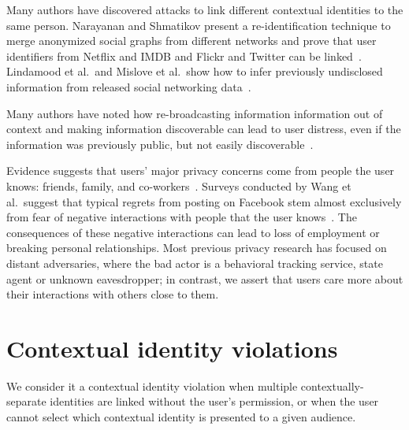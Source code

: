 \documentclass[10pt, conference, compsocconf]{IEEEtran}
\begin{document}
Many authors have discovered attacks to link different contextual identities to
the same person. Narayanan and Shmatikov present a re-identification technique
to merge anonymized social graphs from different networks and prove that
user identifiers from Netflix and IMDB and Flickr and Twitter can be
linked~\cite{narayanan1,narayanan2}. Lindamood et al.~and Mislove et al.~show
how to infer previously undisclosed information from released social networking
data~\cite{lindamood,mislove}.

Many authors have noted how re-broadcasting information information out of
context and making information discoverable can lead to user distress, even if
the information was previously public, but not easily
discoverable~\cite{boyd1,chew,nissenbaum}.

Evidence suggests that users' major privacy concerns come from people the user
knows: friends, family, and co-workers~\cite{fbtips2,fbtips1}.  Surveys
conducted by Wang et al.~suggest that typical regrets from posting on Facebook
stem almost exclusively from fear of negative interactions with people that the
user knows~\cite{wang}. The consequences of these negative interactions can
lead to loss of employment or breaking personal relationships.  Most previous
privacy research has focused on distant adversaries, where the bad actor is a
behavioral tracking service, state agent or unknown eavesdropper; in contrast,
we assert that users care more about their interactions with others close to
them.

\section{Contextual identity violations}
We consider it a contextual identity violation when
multiple contextually-separate identities are linked without the user's
permission, or when the user cannot select which contextual identity is
presented to a given audience.

\label{sec:examples}
\end{document}
